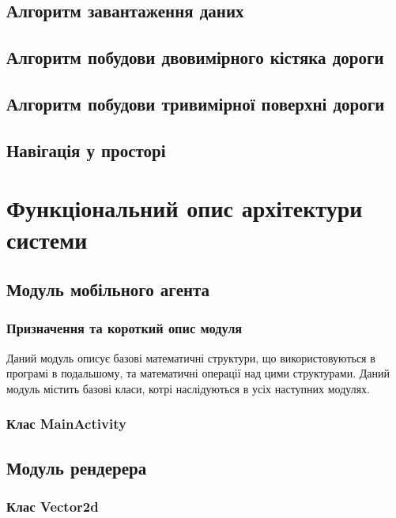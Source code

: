 \documentclass[simple,a4paper,14pt,ukrainian,utf8]{eskdtext}
\begin{document}
	\subsection{Алгоритм завантаження даних}
	
	\subsection{Алгоритм побудови двовимірного кістяка дороги}
	
	\subsection{Алгоритм побудови тривимірної поверхні дороги}
	
	\subsection{Навігація у просторі}
       
\newpage \section{Функціональний опис архітектури системи}

    \subsection{Модуль мобільного агента}

        \subsubsection{Призначення та короткий опис модуля}

            Даний модуль описує базові математичні структури, що використовуються в програмі в подальшому, та математичні операції над цими структурами. Даний модуль містить базові класи, котрі наслідуються в усіх наступних модулях.

        \subsubsection{Клас MainActivity}
        
     \subsection{Модуль рендерера}
     
     	\subsubsection{Клас Vector2d}
     	
\end{document}
